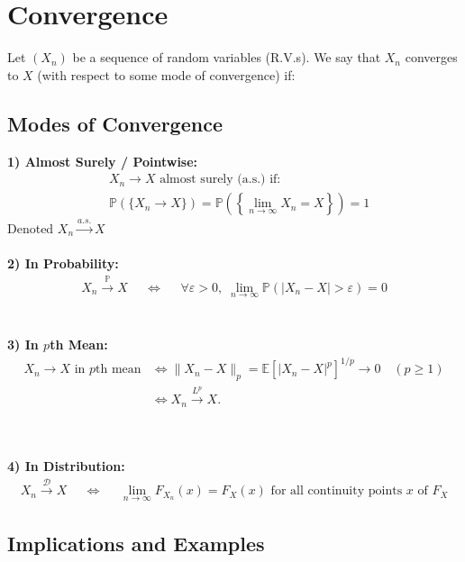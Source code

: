 \documentclass[11pt,a4paper]{article}
\theoremstyle{definition}
\begin{document}
\newpage
\section{Convergence}

Let $(X_n)$ be a sequence of random variables (R.V.s). We say that $X_n$ converges to $X$ (with respect to some mode of convergence) if:

\subsection{Modes of Convergence}

\textbf{1) Almost Surely / Pointwise:}
\begin{align*}
&X_n \to X \text{ almost surely (a.s.) if:} \\
&\mathbb{P}(\{ X_n \to X \}) = \mathbb{P} \left (\left \{\lim \limits _{n \to \infty }X_n = X \right \} \right ) = 1
\end{align*}
Denoted $X_n \xrightarrow{a.s.} X$
~\\~\\ \noindent
\textbf{2) In Probability:}
\begin{align*}
X_n \xrightarrow{\mathbb{P}} X && \iff && \forall \varepsilon > 0,\; \lim_{n \to \infty} \mathbb{P}(|X_n - X| > \varepsilon) = 0
\end{align*}
~\\~\\ \noindent
\textbf{3) In $p$th Mean:}
\begin{align*}
X_n \to X \text{ in $p$th mean}
    &\iff \|X_n - X\|_p = \mathbb{E}[|X_n - X|^p]^{1/p} \to 0 \quad (p \ge 1) \\
    &\iff X_n \xrightarrow{L^p} X.
\end{align*}

~\\~\\ \noindent
\textbf{4) In Distribution:}
\begin{align*}
X_n \xrightarrow{\mathcal{D}} X && \iff && \lim_{n\to \infty} F_{X_n}(x) = F_X(x) \text{ for all continuity points $x$ of $F_X$}
\end{align*}

\subsection{Implications and Examples}
\end{document}
